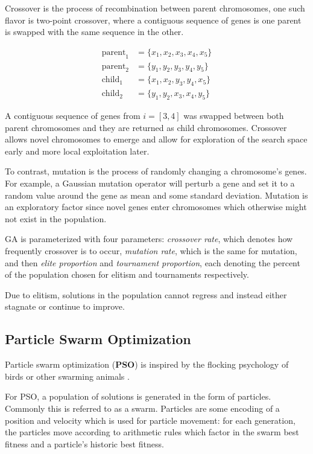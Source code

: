 \documentclass[a4paper,12pt]{article}
\begin{document}
Crossover is the process of recombination between parent chromosomes, one such flavor is two-point crossover, where a contiguous sequence of genes is one parent is swapped with the same sequence in the other.

\[
    \begin{aligned}
      \text{parent}_1 &= \{x_1, x_2, x_3, x_4, x_5\} \\
      \text{parent}_2 &= \{y_1, y_2, y_3, y_4, y_5\} \\
      \text{child}_1 &= \{x_1, x_2, y_3, y_4, x_5\} \\
      \text{child}_2 &= \{y_1, y_2, x_3, x_4, y_5\}
    \end{aligned}
\]

A contiguous sequence of genes from $i = [3, 4]$ was swapped between both parent chromosomes and they are returned as child chromosomes. Crossover allows novel chromosomes to emerge and allow for exploration of the search space early and more local exploitation later.

To contrast, mutation is the process of randomly changing a chromosome's genes. For example, a Gaussian mutation operator will perturb a gene and set it to a random value around the gene as mean and some standard deviation. Mutation is an exploratory factor since novel genes enter chromosomes which otherwise might not exist in the population.

GA is parameterized with four parameters: \textit{crossover rate}, which denotes how frequently crossover is to occur, \textit{mutation rate}, which is the same for mutation, and then \textit{elite proportion} and \textit{tournament proportion}, each denoting the percent of the population chosen for elitism and tournaments respectively.

Due to elitism, solutions in the population cannot regress and instead either stagnate or continue to improve.

\pagebreak

\subsection{Particle Swarm Optimization}

Particle swarm optimization (\textbf{PSO}) is inspired by the flocking psychology of birds or other swarming animals \cite{pso}.

For PSO, a population of solutions is generated in the form of particles. Commonly this is referred to as a swarm. Particles are some encoding of a position and velocity which is used for particle movement: for each generation, the particles move according to arithmetic rules which factor in the swarm best fitness and a particle's historic best fitness.
\end{document}
